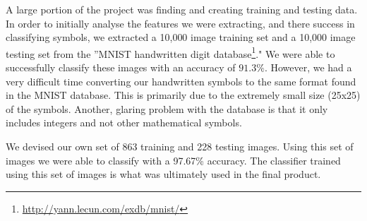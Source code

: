 
A large portion of the project was finding and creating training and testing data. In order to initially analyse the features we were extracting, and there success in classifying symbols, we extracted a 10,000 image training set and a 10,000 image testing set from the  ''MNIST handwritten digit database\footnote{\url{http://yann.lecun.com/exdb/mnist/}}." We were able to successfully classify these images with an accuracy of $91.3\%$. However, we had a very difficult time converting our handwritten symbols to the same format found in the MNIST database. This is primarily due to the extremely small size (25x25) of the symbols. Another, glaring problem with the database is that it only includes integers and not other mathematical symbols.

We devised our own set of 863 training and 228 testing images. Using this set of images we were able to classify with a 97.67\% accuracy. The classifier trained using this set of images is what was ultimately used in the final product.